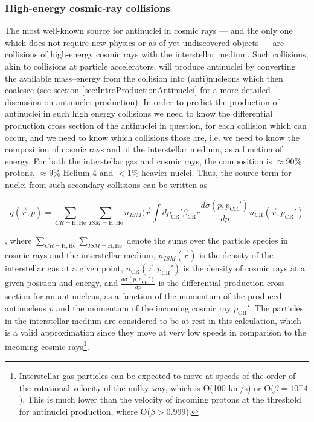 \subsubsection{High-energy cosmic-ray collisions}
The most well-known source for antinuclei in cosmic rays --- and the only one which does not require new physics or as of yet undiscovered objects --- are collisions of high-energy cosmic rays with the interstellar medium. Such collisions, akin to collisions at particle accelerators, will produce antinuclei by converting the available mass--energy from the collision into (anti)nucleons which then coalesce (see section \ref{sec:IntroProductionAntinuclei} for a more detailed discussion on antinuclei production).  In order to predict the production of antinuclei in such high energy collisions we need to know the differential production cross section of the antinuclei in question, for each collision which can occur, and we need to know which collisions those are, i.e. we need to know the composition of cosmic rays and of the interstellar medium, as a function of energy. For both the interstellar gas and cosmic rays, the composition is $\approx$90\% protons, $\approx$9\% Helium-4 and $<$1\% heavier nuclei. Thus, the source term for nuclei from such secondary collisions can be written as 

\begin{equation}\label{eq:secSourceTerm}
    q (\vec{r}, p) = \sum_{CR=\mathrm{H}, \mathrm{He}} \sum_{ISM=\mathrm{H},\mathrm{He}} n_{ISM}(\vec{r} \int dp_{\mathrm{CR}}' \beta_{\mathrm{CR}} c \frac{d\sigma(p, p_{\mathrm{CR}}')}{dp} n_{\mathrm{CR}}(\vec{r}, p_{\mathrm{CR}}')
\end{equation}

, where $\sum_{CR=\mathrm{H}, \mathrm{He}} \sum_{ISM=\mathrm{H},\mathrm{He}}$ denote the sums over the particle species in cosmic rays and the interstellar medium, $n_{ISM}(\vec{r})$ is the density of the interstellar gas at a given point, $n_{\mathrm{CR}}(\vec{r}, p_{\mathrm{CR}}')$ is the density of cosmic rays at a given position and energy, and $\frac{d\sigma(p, p_{\mathrm{CR}}')}{dp}$ is the differential production cross section for an antinucleus, as a function of the momentum of the produced antinucleus $p$ and the momentum of the incoming cosmic ray $p_{\mathrm{CR}}'$. The particles in the interstellar medium are considered to be at rest in this calculation, which is a valid approximation since they move at  very low speeds in comparison to the incoming cosmic rays\footnote{Interstellar gas particles can be expected to move at speeds of the order of the rotational velocity of the milky way, which is O(100 km/s) or O($\beta = 10^-4$). This is much lower than the velocity of incoming protons at the threshold for antinuclei production, where O($\beta >0.999$).}. \\

